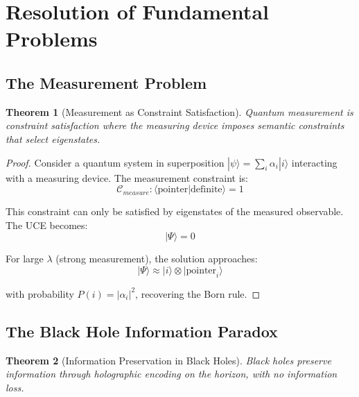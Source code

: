 \documentclass[12pt,a4paper]{article}
\newtheorem{theorem}{Theorem}[section]
\begin{document}
\section{Resolution of Fundamental Problems}

\subsection{The Measurement Problem}

\begin{theorem}[Measurement as Constraint Satisfaction]
Quantum measurement is constraint satisfaction where the measuring device imposes semantic constraints that select eigenstates.
\end{theorem}

\begin{proof}
Consider a quantum system in superposition $|\psi\rangle = \sum_i \alpha_i |i\rangle$ interacting with a measuring device. The measurement constraint is:
\begin{equation}
\mathcal{C}_{measure}: \langle \text{pointer}|\text{definite}\rangle = 1
\end{equation}

This constraint can only be satisfied by eigenstates of the measured observable. The UCE becomes:
\begin{equation}
[\mathcal{H}_{total} + \lambda \mathcal{C}_{measure}]|\Psi\rangle = 0
\end{equation}

For large $\lambda$ (strong measurement), the solution approaches:
\begin{equation}
|\Psi\rangle \approx |i\rangle \otimes |\text{pointer}_i\rangle
\end{equation}

with probability $P(i) = |\alpha_i|^2$, recovering the Born rule.
\end{proof}

\subsection{The Black Hole Information Paradox}

\begin{theorem}[Information Preservation in Black Holes]
Black holes preserve information through holographic encoding on the horizon, with no information loss.
\end{theorem}
\end{document}

